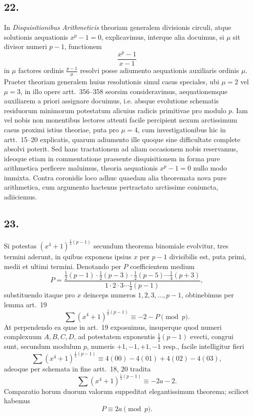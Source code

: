 \documentclass[12pt]{article}
\begin{document}
\subsection*{22.}

In \emph{Disquisitionibus Arithmeticis} theoriam generalem divisionis circuli, atque solutionis aequationis $x^p-1=0$, explicavimus, interque alia docuimus, si $\mu$ sit divisor numeri $p-1$, functionem
\[
\frac{x^p-1}{x-1}
\]
in $\mu$ factores ordinis $\frac{p-1}{\mu}$ resolvi posse adiumento aequationis auxiliaris ordinis $\mu$. Praeter theoriam generalem huius resolutionis simul casus speciales, ubi $\mu=2$ vel $\mu=3$, in illo opere artt.~356--358 seorsim consideravimus, aequationemque auxiliarem a priori assignare docuimus, i.e. absque evolutione schematis residuorum minimorum potestatum alicuius radicis primitivae pro modulo $p$. Iam vel nobis non monentibus lectores attenti facile percipient nexum arctissimum casus proximi istius theoriae, puta pro $\mu=4$, cum investigationibus hic in artt.~15--20 explicatis, quarum adiumento ille quoque sine difficultate complete absolvi poterit. Sed hanc tractationem ad aliam occasionem nobis reservamus, ideoque etiam in commentatione praesente disquisitionem in forma pure arithmetica perficere maluimus, theoria aequationis $x^p-1=0$ nullo modo immixta. Contra coronidis loco adhuc quaedam alia theoremata nova pure arithmetica, cum argumento hactenus pertractato arctissime coniuncta, adiiciemus.

\subsection*{23.}

Si potestas $(x^4+1)^{\frac12(p-1)}$ secundum theorema binomiale evolvitur, tres termini aderunt, in quibus exponens ipsius $x$ per $p-1$ divisibilis est, puta primi, medii et ultimi termini. Denotando per $P$ coefficientem medium
\[
P=\frac{\frac12(p-1)\cdot\frac12(p-3)\cdot\frac12(p-5)\cdots\frac14(p+3)}
{1\cdot2\cdot3\cdots\frac14(p-1)},
\]
substituendo itaque pro $x$ deinceps numeros $1,2,3,\ldots,p-1$, obtinebimus per lemma art.~19
\[
\sum (x^4+1)^{\frac12(p-1)}\equiv -2-P \pmod p.
\]
At perpendendo ea quae in art.~19 exposuimus, insuperque quod numeri complexuum $A,B,C,D$, ad potestatem exponentis $\frac12(p-1)$ evecti, congrui sunt, secundum modulum $p$, numeris $+1,-1,+1,-1$ resp., facile intelligitur fieri
\[
\sum (x^4+1)^{\frac12(p-1)}
 \equiv 4(00)-4(01)+4(02)-4(03),
\]
adeoque per schemata in fine artt.~18, 20 tradita
\[
\sum (x^4+1)^{\frac12(p-1)}\equiv -2a-2.
\]
Comparatio horum duorum valorum suppeditat elegantissimum theorema; scilicet habemus
\[
P\equiv 2a\pmod p.
\]
\end{document}
